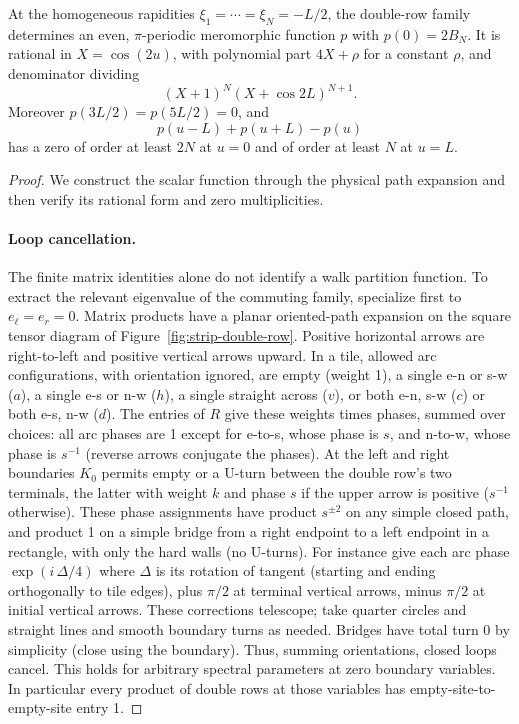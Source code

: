 \begin{auxlemma}
At the homogeneous rapidities $\xi_1=\cdots=\xi_N=-L/2$, the double-row family determines an even, $\pi$-periodic meromorphic function $p$ with $p(0)=2B_N$. It is rational in $X=\cos(2u)$, with polynomial part $4X+\rho$ for a constant $\rho$, and denominator dividing
\[
 (X+1)^N(X+\cos 2L)^{N+1}.
\]
Moreover $p(3L/2)=p(5L/2)=0$, and
\[
 p(u-L)+p(u+L)-p(u)
\]
has a zero of order at least $2N$ at $u=0$ and of order at least $N$ at $u=L$.
\end{auxlemma}
\begin{proof}
We construct the scalar function through the physical path expansion and then verify its rational form and zero multiplicities.

\paragraph{Loop cancellation.}
The finite matrix identities alone do not identify a walk partition function. To extract the relevant eigenvalue of the commuting family, specialize first to $e_\ell=e_r=0$. Matrix products have a planar oriented-path expansion on the square tensor diagram of Figure~\ref{fig:strip-double-row}. Positive horizontal arrows are right-to-left and positive vertical arrows upward. In a tile, allowed arc configurations, with orientation ignored, are empty (weight 1), a single e-n or s-w ($a$), a single e-s or n-w ($h$), a single straight across ($v$), or both e-n, s-w ($c$) or both e-s, n-w ($d$). The entries of $R$ give these weights times phases, summed over choices: all arc phases are 1 except for e-to-s, whose phase is $s$, and n-to-w, whose phase is $s^{-1}$ (reverse arrows conjugate the phases). At the left and right boundaries $K_0$ permits empty or a U-turn between the double row's two terminals, the latter with weight $k$ and phase $s$ if the upper arrow is positive ($s^{-1}$ otherwise). These phase assignments have product $s^{\pm2}$ on any simple closed path, and product 1 on a simple bridge from a right endpoint to a left endpoint in a rectangle, with only the hard walls (no U-turns). For instance give each arc phase $\exp(i\,\Delta/4)$ where $\Delta$ is its rotation of tangent (starting and ending orthogonally to tile edges), plus $\pi/2$ at terminal vertical arrows, minus $\pi/2$ at initial vertical arrows. These corrections telescope; take quarter circles and straight lines and smooth boundary turns as needed. Bridges have total turn 0 by simplicity (close using the boundary). Thus, summing orientations, closed loops cancel. This holds for arbitrary spectral parameters at zero boundary variables. In particular every product of double rows at those variables has empty-site-to-empty-site entry 1.


\end{proof}
